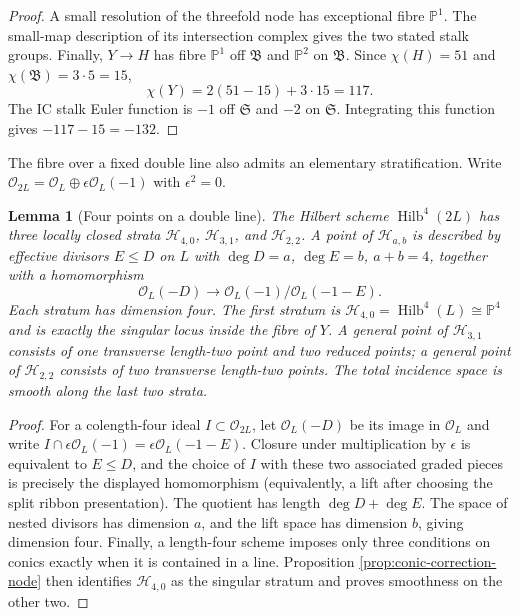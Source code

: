 \documentclass[11pt,reqno]{amsart}
\newtheorem{lemma}[theorem]{Lemma}
\theoremstyle{definition}
\newcommand{\Pp}{\mathbb P}
\newcommand{\Ocal}{\mathcal O}
\newcommand{\Hilb}{\operatorname{Hilb}}
\begin{document}
\begin{proof}
A small resolution of the threefold node has exceptional fibre $\Pp^1$.
The small-map description of its intersection complex gives the two stated
stalk groups.  Finally, $Y\to H$ has fibre $\Pp^1$ off $\mathfrak B$ and
$\Pp^2$ on $\mathfrak B$.  Since
$\chi(H)=51$ and $\chi(\mathfrak B)=3\cdot5=15$,
\[
 \chi(Y)=2(51-15)+3\cdot15=117.
\]
The IC stalk Euler function is $-1$ off $\mathfrak S$ and $-2$ on
$\mathfrak S$.  Integrating this function gives
$-117-15=-132$.
\end{proof}

The fibre over a fixed double line also admits an elementary stratification.
Write
$\Ocal_{2L}=\Ocal_L\oplus\epsilon\Ocal_L(-1)$ with $\epsilon^2=0$.

\begin{lemma}[Four points on a double line]\label{lem:four-points-double-line}
The Hilbert scheme $\Hilb^4(2L)$ has three locally closed strata
$\mathcal H_{4,0}$, $\mathcal H_{3,1}$, and $\mathcal H_{2,2}$.  A point of
$\mathcal H_{a,b}$ is described by effective divisors $E\le D$ on $L$ with
$\deg D=a$, $\deg E=b$, $a+b=4$, together with a homomorphism
\[
 \Ocal_L(-D)\longrightarrow
 \Ocal_L(-1)/\Ocal_L(-1-E).
\]
Each stratum has dimension four.  The first stratum is
$\mathcal H_{4,0}=\Hilb^4(L)\cong\Pp^4$ and is exactly the singular locus
inside the fibre of $Y$.  A general point of $\mathcal H_{3,1}$ consists of
one transverse length-two point and two reduced points; a general point of
$\mathcal H_{2,2}$ consists of two transverse length-two points.  The total
incidence space is smooth along the last two strata.
\end{lemma}

\begin{proof}
For a colength-four ideal $I\subset\Ocal_{2L}$, let $\Ocal_L(-D)$ be its
image in $\Ocal_L$ and write
$I\cap\epsilon\Ocal_L(-1)=\epsilon\Ocal_L(-1-E)$.  Closure under
multiplication by $\epsilon$ is equivalent to $E\le D$, and the choice of
$I$ with these two associated graded pieces is precisely the displayed
homomorphism (equivalently, a lift after choosing the split ribbon
presentation).  The quotient has length $\deg D+\deg E$.  The space of
nested divisors has dimension $a$, and the lift space has dimension $b$, giving dimension
four.  Finally, a length-four scheme imposes only three conditions on
conics exactly when it is contained in a line.  Proposition
\ref{prop:conic-correction-node} then identifies $\mathcal H_{4,0}$ as the
singular stratum and proves smoothness on the other two.
\end{proof}
\end{document}
